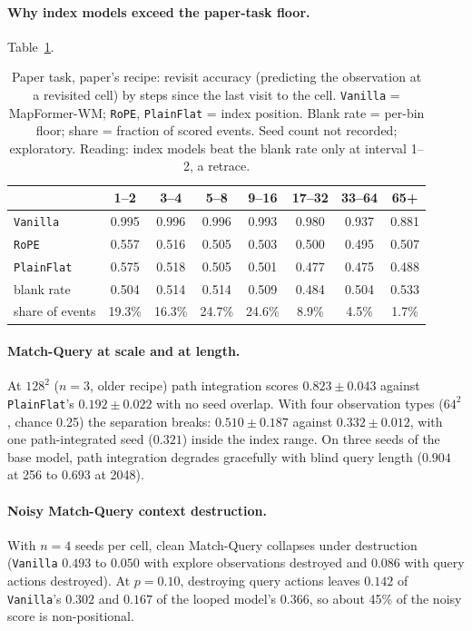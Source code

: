 \documentclass[10pt]{article}
\newcommand{\arm}[1]{\texttt{#1}}
\begin{document}
\paragraph{Why index models exceed the paper-task floor.} Table~\ref{tab:revisit}.
\begin{table}[h]
\centering
\small
\captionsetup{font=footnotesize,skip=4pt}
\caption{Paper task, paper's recipe: revisit accuracy (predicting the observation at a revisited cell) by steps since the last visit to the cell. \arm{Vanilla} = MapFormer-WM; \arm{RoPE}, \arm{PlainFlat} = index position. Blank rate = per-bin floor; share = fraction of scored events. Seed count not recorded; exploratory. Reading: index models beat the blank rate only at interval 1--2, a retrace.}
\label{tab:revisit}
\begin{tabular}{@{}lccccccc@{}}
\toprule
 & 1--2 & 3--4 & 5--8 & 9--16 & 17--32 & 33--64 & 65+ \\
\midrule
\arm{Vanilla}   & 0.995 & 0.996 & 0.996 & 0.993 & 0.980 & 0.937 & 0.881 \\
\arm{RoPE}      & 0.557 & 0.516 & 0.505 & 0.503 & 0.500 & 0.495 & 0.507 \\
\arm{PlainFlat} & 0.575 & 0.518 & 0.505 & 0.501 & 0.477 & 0.475 & 0.488 \\
blank rate      & 0.504 & 0.514 & 0.514 & 0.509 & 0.484 & 0.504 & 0.533 \\
share of events & 19.3\% & 16.3\% & 24.7\% & 24.6\% & 8.9\% & 4.5\% & 1.7\% \\
\bottomrule
\end{tabular}
\end{table}

\paragraph{Match-Query at scale and at length.} At $128^2$ ($n=3$, older recipe) path integration scores
$0.823\pm0.043$ against \arm{PlainFlat}'s $0.192\pm0.022$ with no seed overlap. With four observation types
($64^2$, chance 0.25) the separation breaks: $0.510\pm0.187$ against $0.332\pm0.012$, with one path-integrated
seed ($0.321$) inside the index range. On three seeds of the base model, path integration degrades
gracefully with blind query length ($0.904$ at 256 to $0.693$ at 2048). %

\paragraph{Noisy Match-Query context destruction.} With $n=4$ seeds per cell, clean Match-Query collapses
under destruction (\arm{Vanilla} $0.493$ to $0.050$ with explore observations destroyed and $0.086$ with query
actions destroyed). At $p=0.10$, destroying query actions leaves $0.142$ of \arm{Vanilla}'s $0.302$ and
$0.167$ of the looped model's $0.366$, so about 45\% of the noisy score is non-positional.
\end{document}
